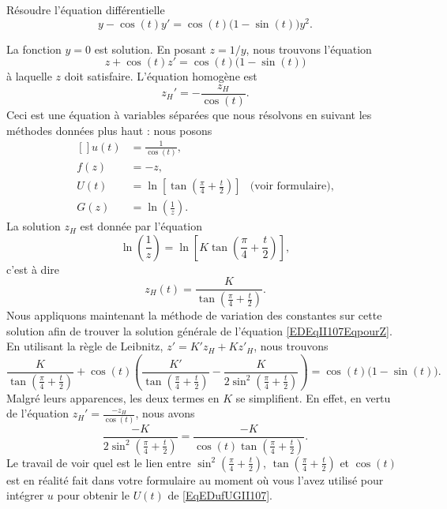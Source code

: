 \begin{example} \label{ExYCPtxgZ}
    Résoudre l'équation différentielle
    \begin{equation}
        y-\cos(t)y'=\cos(t)\big(1-\sin(t)\big)y^2.
    \end{equation}

La fonction $y=0$ est solution. En posant $z=1/y$, nous trouvons l'équation
\begin{equation}		\label{EDEqII107EqpourZ}
	z+\cos(t)z'=\cos(t)\big(1-\sin(t)\big)
\end{equation}
à laquelle $z$ doit satisfaire. L'équation homogène est
\begin{equation}
	z_H'=-\frac{ z_H }{ \cos(t) }.
\end{equation}
Ceci est une équation à variables séparées que nous résolvons en suivant les méthodes données plus haut : nous posons
\begin{equation}		\label{EqEDufUGII107}
	\begin{aligned}[]
		u(t)	&=\frac{1}{ \cos(t) }, \\
		f(z)	&=-z,\\
		U(t)	&=\ln\left[ \tan\left( \frac{ \pi }{ 4 }+\frac{ t }{ 2 } \right) \right]	&\text{(voir formulaire)},\\
		G(z)	&=\ln\left( \frac{1}{ z } \right).
	\end{aligned}
\end{equation}
La solution $z_H$ est donnée par l'équation
\begin{equation}
	\ln\left( \frac{1}{ z } \right)=\ln\left[ K\tan\left( \frac{ \pi }{ 4 }+\frac{ t }{ 2 } \right) \right],
\end{equation}
c'est à dire
\begin{equation}
	z_H(t)=\frac{ K }{ \tan\left( \frac{ \pi }{ 4 }+\frac{ t }{ 2 } \right) }.
\end{equation}
Nous appliquons maintenant la méthode de variation des constantes sur cette solution afin de trouver la solution générale de l'équation \eqref{EDEqII107EqpourZ}. En utilisant la règle de Leibnitz, $z'=K'z_H+Kz'_H$, nous trouvons
\begin{equation}
	\frac{ K }{ \tan\left( \frac{ \pi }{ 4 }+\frac{ t }{ 2 } \right) }+\cos(t)\left( \frac{ K' }{  \tan\left( \frac{ \pi }{ 4 }+\frac{ t }{ 2 } \right) }-\frac{ K }{ 2\sin^2 \left( \frac{ \pi }{ 4 }+\frac{ t }{ 2 } \right)  } \right)=\cos(t)\big( 1-\sin(t) \big).
\end{equation}
Malgré leurs apparences, les deux termes en $K$ se simplifient. En effet, en vertu de l'équation $z_H'=\frac{ -z_H }{ \cos(t) }$, nous avons
\begin{equation}
	\frac{ -K }{ 2\sin^2\left( \frac{ \pi }{ 4 }+\frac{ t }{ 2 } \right)}=\frac{ -K }{ \cos(t)\tan\left( \frac{ \pi }{ 4 }+\frac{ t }{ 2 } \right) }.
\end{equation}
Le travail de voir quel est le lien entre $\sin^2\left( \frac{ \pi }{ 4 }+\frac{ t }{ 2 } \right)$, $\tan\left( \frac{ \pi }{ 4 }+\frac{ t }{ 2 } \right)$ et $\cos(t)$ est en réalité fait dans votre formulaire au moment où vous l'avez utilisé pour intégrer $u$ pour obtenir le $U(t)$ de \eqref{EqEDufUGII107}.


\end{example}
